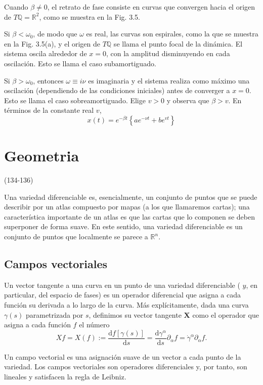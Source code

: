 Cuando $\beta \neq 0$, el retrato de fase consiste en curvas que convergen hacia el origen de $T \mathbb{Q}=\mathbb{R}^{2}$, como se muestra en la Fig. 3.5.

Si $\beta<\omega_{0}$, de modo que $\omega$ es real, las curvas son espirales, como la que se muestra en la Fig. 3.5(a), y el origen de $T \mathbb{Q}$ se llama el punto focal de la dinámica. El sistema oscila alrededor de $x=0$, con la amplitud disminuyendo en cada oscilación. Esto se llama el caso subamortiguado.

Si $\beta>\omega_{0}$, entonces $\omega \equiv i \nu$ es imaginaria y el sistema realiza como máximo una oscilación (dependiendo de las condiciones iniciales) antes de converger a $x=0$. Esto se llama el caso sobreamortiguado. Elige $v>0$ y observa que $\beta>v$. En términos de la constante real $v$,
$$
x(t)=e^{-\beta t}\left\{a e^{-\nu t}+b e^{v t}\right\}
$$


\section{Geometria}(134-136)

Una variedad diferenciable es, esencialmente, un conjunto de puntos que se puede describir por un atlas compuesto por mapas (a los que llamaremos cartas); una característica importante de un atlas es que las cartas que lo componen se deben superponer de forma suave. En este sentido, una variedad diferenciable es un conjunto de puntos que localmente se parece a $\mathbb{R}^{n}$.
\subsection{Campos vectoriales}

\begin{definition}
  Un vector tangente a una curva en un punto de una variedad diferenciable ( $y$, en particular, del espacio de fases) es un operador diferencial que asigna a cada función su derivada a lo largo de la curva. Más explícitamente, dada una curva $\gamma(s)$ parametrizada por $s$, definimos su vector tangente $\boldsymbol{X}$ como el operador que asigna a cada función $f$ el número
$$
X f=X(f):=\frac{\mathrm{d} f[\gamma(s)]}{\mathrm{d} s}=\frac{\mathrm{d} \gamma^{\alpha}}{\mathrm{d} s} \partial_{\alpha} f=\dot{\gamma}^{\alpha} \partial_{\alpha} f .
$$
\end{definition}

\begin{definition}
  Un campo vectorial es una asignación suave de un vector a cada punto de la variedad. Los campos vectoriales son operadores diferenciales y, por tanto, son lineales y satisfacen la regla de Leibniz.
\end{definition}

